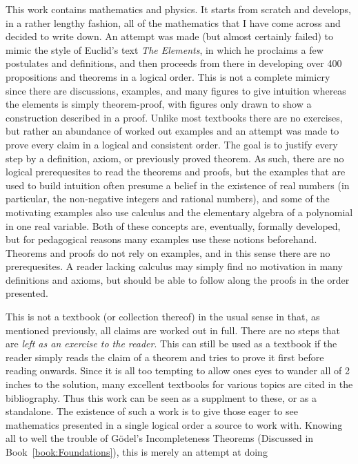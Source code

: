 This work contains mathematics and physics. It starts from scratch and develops,
in a rather lengthy fashion, all of the mathematics that I have come across and
decided to write down. An attempt was made (but almost certainly failed) to
mimic the style of Euclid's text \textit{The Elements}, in which he proclaims a
few postulates and definitions, and then proceeds from there in developing over
400 propositions and theorems in a logical order. This is not a complete mimicry
since there are discussions, examples, and many figures to give intuition
whereas the elements is simply theorem-proof, with figures only drawn to show a
construction described in a proof. Unlike most textbooks there are no exercises,
but rather an abundance of worked out examples and an attempt was made to prove
every claim in a logical and consistent order. The goal is to justify every step
by a definition, axiom, or previously proved theorem. As such, there are no
logical prerequesites to read the theorems and proofs, but the examples that are
used to build intuition often presume a belief in the existence of real numbers
(in particular, the non-negative integers and rational numbers), and some of
the motivating examples also use calculus and the elementary algebra of a
polynomial in one real variable. Both of these concepts are, eventually,
formally developed, but for pedagogical reasons many examples use these notions
beforehand. Theorems and proofs do not rely on examples, and in this sense there
are no prerequesites. A reader lacking calculus may simply find no motivation in
many definitions and axioms, but should be able to follow along the proofs in
the order presented.
\par\hfill\par
This is not a textbook (or collection thereof) in the usual sense in that, as
mentioned previously, all claims are worked out in full. There are no steps that
are \textit{left as an exercise to the reader}. This can still be used as a
textbook if the reader simply reads the claim of a theorem and tries to prove
it first before reading onwards. Since it is all too tempting to allow ones eyes
to wander all of 2 inches to the solution, many excellent textbooks for various
topics are cited in the bibliography. Thus this work can be seen as a supplment
to these, or as a standalone. The existence of such a work is to give those
eager to see mathematics presented in a single logical order a source to work
with. Knowing all to well the trouble of G\"{o}del's Incompleteness Theorems
(Discussed in Book~\ref{book:Foundations}), this is merely an attempt at doing
